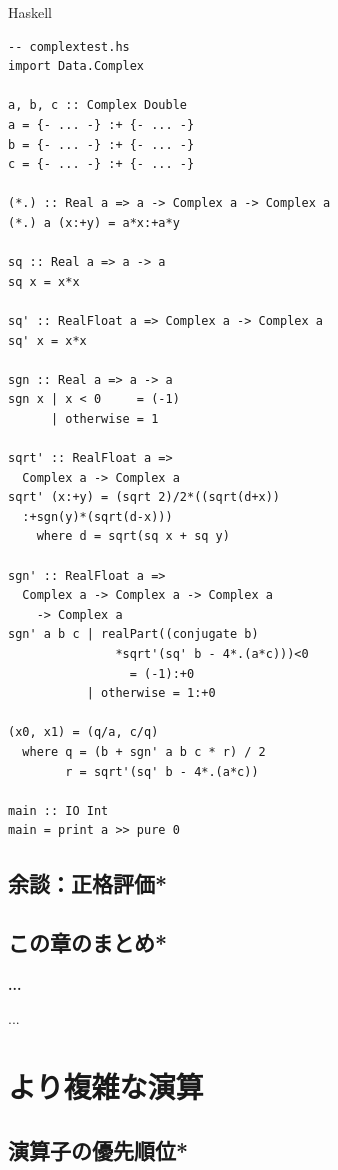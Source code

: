 \documentclass[a5paper,twoside,fleqn]{jsbook}
\newcommand{\programminglanguage}[1]{\textsf{#1}}
\newcommand{\haskell}{\programminglanguage{Haskell}}
\newenvironment{note}[1]{\begin{boxnote}\begin{center}\textbf{#1}\end{center}}{\end{boxnote}}
\newenvironment{haskellcode}{\begin{itembox}[r]{\haskell}}{\end{itembox}}
\begin{document}
\begin{haskellcode}
\begin{verbatim}
-- complextest.hs
import Data.Complex

a, b, c :: Complex Double
a = {- ... -} :+ {- ... -}
b = {- ... -} :+ {- ... -}
c = {- ... -} :+ {- ... -}

(*.) :: Real a => a -> Complex a -> Complex a
(*.) a (x:+y) = a*x:+a*y

sq :: Real a => a -> a
sq x = x*x

sq' :: RealFloat a => Complex a -> Complex a
sq' x = x*x

sgn :: Real a => a -> a
sgn x | x < 0     = (-1)
      | otherwise = 1

sqrt' :: RealFloat a =>
  Complex a -> Complex a
sqrt' (x:+y) = (sqrt 2)/2*((sqrt(d+x))
  :+sgn(y)*(sqrt(d-x)))
    where d = sqrt(sq x + sq y)

sgn' :: RealFloat a =>
  Complex a -> Complex a -> Complex a
    -> Complex a
sgn' a b c | realPart((conjugate b)
               *sqrt'(sq' b - 4*.(a*c)))<0
                 = (-1):+0
           | otherwise = 1:+0

(x0, x1) = (q/a, c/q)
  where q = (b + sgn' a b c * r) / 2
        r = sqrt'(sq' b - 4*.(a*c))

main :: IO Int
main = print a >> pure 0
\end{verbatim}
\end{haskellcode}

\section{余談：正格評価*}


\section{この章のまとめ*}

\begin{note}{...}
...
\end{note}

\chapter{より複雑な演算}

\section{演算子の優先順位*}
\end{document}
